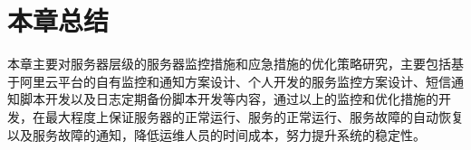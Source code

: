 \section{本章总结}
本章主要对服务器层级的服务器监控措施和应急措施的优化策略研究，主要包括基于阿里云平台的自有监控和通知方案设计、个人开发的服务监控方案设计、短信通知脚本开发以及日志定期备份脚本开发等内容，通过以上的监控和优化措施的开发，在最大程度上保证服务器的正常运行、服务的正常运行、服务故障的自动恢复以及服务故障的通知，降低运维人员的时间成本，努力提升系统的稳定性。